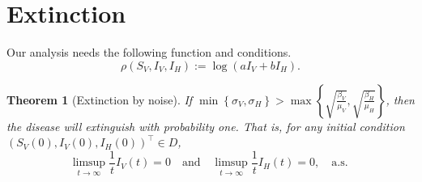 \documentclass{amsart}
\theoremstyle{plain}
\newtheorem{theorem}{Theorem}
\theoremstyle{definition}
\begin{document}
    \section{Extinction}
        Our analysis needs the following function and conditions.
        \begin{equation}
            \rho (S_V, I_V, I_H) := \log (a I_V + b I_H) .
        \end{equation}
%
%
%
%
%
        \begin{theorem}[Extinction by noise]
                If 
                $
                    \displaystyle
                    \min
                        \left \{
                              \sigma_V, \sigma_H 
                        \right\} 
                        > 
                    \max 
                        \left \{
                            \sqrt{\frac{\beta_V}{\mu_V}},
                            \sqrt{\frac{\beta_H}{\mu_H}}
                        \right \}
                $,
                then the disease will extinguish with probability one.  That is,
                for any initial condition $(S_V(0), I_V(0), I_H(0)) ^{\top} \in 
                D$,
                $$
                    \limsup_{t \to \infty} 
                        \frac{1}{t} I_V(t) = 0 
                        \quad \text{and} \quad
                    \limsup_{t \to \infty} 
                        \frac{1}{t} I_H(t) = 0, \quad 
                        \text{
                           a.s.
                        }
                $$
        \end{theorem}        
\end{document}
